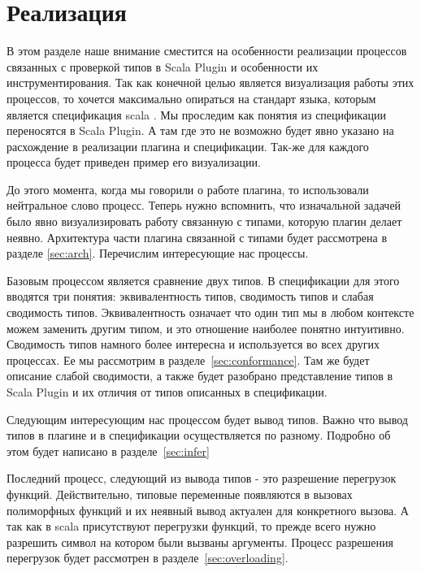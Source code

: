 \section{Реализация}
\label{sec:implementation}

В этом разделе наше внимание сместится на особенности реализации процессов
связанных с проверкой типов в Scala Plugin и особенности их инструментирования.
Так как конечной целью является визуализация работы этих процессов, то
хочется максимально опираться на стандарт языка, которым является спецификация
scala \cite{scala_spec}.
Мы проследим как понятия из спецификации переносятся в Scala Plugin.
А там где это не возможно будет явно указано на расхождение в реализации плагина и
спецификации.
Так-же для каждого процесса будет приведен пример его визуализации.


До этого момента, когда мы говорили о работе плагина, то использовали
нейтральное слово процесс.
Теперь нужно вспомнить, что изначальной задачей было явно визуализировать
работу связанную с типами, которую плагин делает неявно.
Архитектура части плагина связанной с типами будет
рассмотрена в разделе \ref{sec:arch}.
Перечислим интересующие нас процессы.

Базовым процессом является сравнение двух типов.
В спецификации для этого вводятся три понятия: эквивалентность типов, сводимость
типов и слабая сводимость типов.
Эквивалентность означает что один тип мы в любом контексте можем заменить другим
типом, и это отношение наиболее понятно интуитивно.
Сводимость типов намного более интересна и используется во всех других процессах.
Ее мы рассмотрим в разделе~\ref{sec:conformance}.
Там же будет описание слабой сводимости, а также будет разобрано представление
типов в Scala Plugin и их отличия от типов описанных в спецификации.

Следующим интересующим нас процессом будет вывод типов.
Важно что вывод типов в плагине и в спецификации осуществляется по разному.
Подробно об этом будет написано в разделе~\ref{sec:infer}

Последний процесс, следующий из вывода типов - это разрешение перегрузок функций.
Действительно, типовые переменные появляются в вызовах полиморфных
функций и их неявный вывод актуален для конкретного вызова.
А так как в scala присутствуют перегрузки функций, то прежде всего нужно
разрешить символ на котором были вызваны аргументы.
Процесс разрешения перегрузок будет рассмотрен в разделе~\ref{sec:overloading}.

